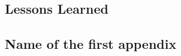 \documentclass{l4proj}
\begin{document}
\section{Lessons Learned}
 
\begin{appendices}
 
\chapter{Name of the first appendix}
 
\end{appendices}
 
 


\end{document}

